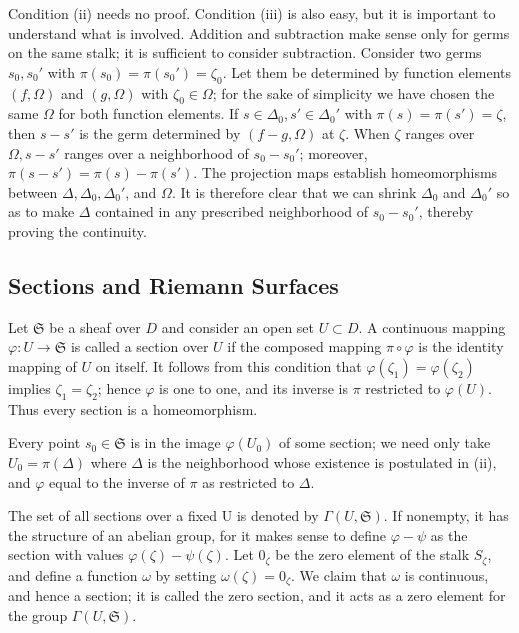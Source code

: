 Condition (ii) needs no proof. Condition (iii) is also easy, but it is important to understand what is involved. Addition and subtraction make sense only for germs on the same stalk; it is sufficient to consider subtraction. Consider two germs $s_0, s_0'$ with $\pi(s_0) = \pi(s_0') = \zeta_0$. Let them be determined by function elements $(f, \Omega)$ and $(g, \Omega)$ with $\zeta_0 \in \Omega$; for the sake of simplicity we have chosen the same $\Omega$ for both function elements. If $s \in \Delta_0, s' \in \Delta_0'$ with $\pi(s) = \pi(s') = \zeta$, then $s - s'$ is the germ determined by $(f - g, \Omega)$ at $\zeta$. When $\zeta$ ranges over $\Omega, s - s'$ ranges over a neighborhood of $s_0 - s_0'$; moreover, $\pi(s - s') = \pi(s) - \pi(s')$. The projection maps establish homeomorphisms between $\Delta, \Delta_0, \Delta_0'$, and $\Omega$. It is therefore clear that we can shrink $\Delta_0$ and $\Delta_0'$ so as to make $\Delta$ contained in any prescribed neighborhood of $s_0 - s_0'$, thereby proving the continuity.

\setcounter{section}{1}\setcounter{subsection}{2}\subsection{Sections and Riemann Surfaces}\label{sec:8.1.3}
Let $\mathfrak{S}$ be a sheaf over $D$ and consider an open set $U \subset D$. A continuous mapping $\varphi: U \to \mathfrak{S}$ is called a section over $U$ if the composed mapping $\pi \circ \varphi$ is the identity mapping of $U$ on itself. It follows from this condition that $\varphi(\zeta_1) = \varphi(\zeta_2)$ implies $\zeta_1 = \zeta_2$; hence $\varphi$ is one to one, and its inverse is $\pi$ restricted to $\varphi(U)$. Thus every section is a homeomorphism.

Every point $s_0 \in \mathfrak{S}$ is in the image $\varphi(U_0)$ of some section; we need only take $U_0 = \pi(\Delta)$ where $\Delta$ is the neighborhood whose existence is postulated in (ii), and $\varphi$ equal to the inverse of $\pi$ as restricted to $\Delta$.

The set of all sections over a fixed U is denoted by $\Gamma(U,\mathfrak{S})$. If nonempty, it has the structure of an abelian group, for it makes sense to define $\varphi - \psi$ as the section with values $\varphi(\zeta) - \psi(\zeta)$. Let $0_{\zeta}$ be the zero element of the stalk $S_{\zeta}$, and define a function $\omega$ by setting $\omega(\zeta) = 0_{\zeta}$. We claim that $\omega$ is continuous, and hence a section; it is called the zero section, and it acts as a zero element for the group $\Gamma(U,\mathfrak{S})$.

